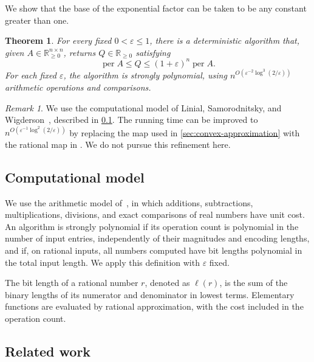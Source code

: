 \documentclass[11pt,reqno,letterpaper]{amsart}
\numberwithin{equation}{section}
\newtheorem{theorem}{Theorem}[section]
\theoremstyle{definition}
\theoremstyle{remark}
\newtheorem{remark}[remark]{Remark}
\newcommand{\R}{\mathbb R}
\DeclareMathOperator{\per}{per}
\begin{document}
We show that the base of the exponential factor can be taken to be any constant greater than one.

\begin{theorem}\label{thm:main}
For every fixed $0<\varepsilon\le1$, there is a deterministic
algorithm that, given $A\in\R_{\ge0}^{n\times n}$, returns $Q\in\R_{\ge0}$ satisfying
\begin{equation}\label{eq:main}
 \per A\le Q\le(1+\varepsilon)^n\per A.
\end{equation}
For each fixed $\varepsilon$, the algorithm is strongly polynomial,
using $n^{O(\varepsilon^{-2}\log^3(2/\varepsilon))}$ arithmetic
operations and comparisons.
\end{theorem}

\begin{remark}
We use the computational model of Linial, Samorodnitsky, and
Wigderson~\cite{LSW}, described in \cref{sec:computation}.
The running time can be improved to
$n^{O(\varepsilon^{-1}\log^2(2/\varepsilon))}$
by replacing the map used in \cref{sec:convex-approximation}
with the rational map in \cite[Lemma~2.3]{BarvinokReal}.
We do not pursue this refinement here.
\end{remark}



\subsection{Computational model}\label{sec:computation}

We use the arithmetic model of~\cite{LSW}, in which additions,
subtractions, multiplications, divisions, and exact comparisons
of real numbers have unit cost.
An algorithm is strongly polynomial if its operation count is
polynomial in the number of input entries, independently of
their magnitudes and encoding lengths, and if, on rational
inputs, all numbers computed have bit lengths polynomial in
the total input length.
We apply this definition with $\varepsilon$ fixed.

The bit length of a rational number $r$, denoted as $\ell(r)$, is the sum of the binary
lengths of its numerator and denominator in lowest terms.
Elementary functions are evaluated by rational approximation,
with the cost included in the operation count.

\subsection{Related work}\label{sec:related-work}
\end{document}
